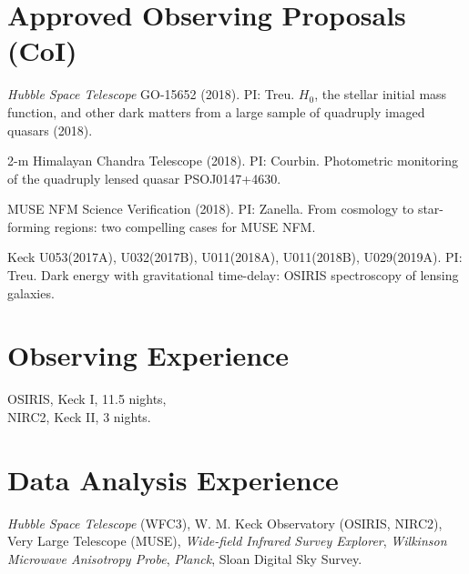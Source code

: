 \documentclass[margin, line]{res}
\begin{document}
\begin{resume}
\section{\sc Approved Observing Proposals (CoI)}
\begin{etaremune}
\item \textit{Hubble Space Telescope} GO-15652 (2018). PI: Treu. $H_0$, the stellar initial mass function, and other dark matters from a large sample of quadruply imaged quasars (2018).
\item 2-m Himalayan Chandra Telescope (2018). PI: Courbin. Photometric monitoring of the quadruply lensed quasar PSOJ0147+4630.
\item MUSE NFM Science Verification (2018). PI: Zanella. From cosmology to star-forming regions: two compelling cases for MUSE NFM.
\item Keck U053(2017A), U032(2017B), U011(2018A),  U011(2018B), U029(2019A). PI: Treu. Dark energy with gravitational time-delay: OSIRIS spectroscopy of lensing galaxies.
\end{etaremune}


\section{\sc Observing Experience}
OSIRIS, Keck I, 11.5 nights,\\
NIRC2, Keck II, 3 nights. 


\section{\sc Data Analysis Experience}
\textit{Hubble Space Telescope} (WFC3), 
W. M. Keck Observatory (OSIRIS, NIRC2),
Very Large Telescope (MUSE),
{\it Wide-field Infrared Survey Explorer},
{\it Wilkinson Microwave Anisotropy Probe},
{\it Planck},
Sloan Digital Sky Survey.

%
%
%



\end{resume}
\end{document}
